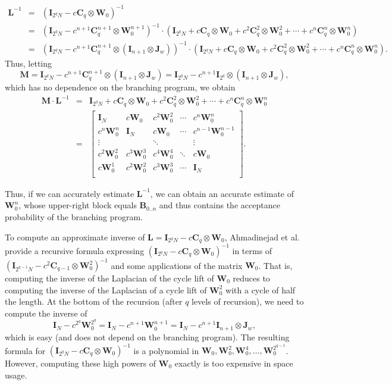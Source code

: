\documentclass[11pt]{article}
\numberwithin{equation}{section}
\theoremstyle{definition}
\theoremstyle{plain}
\newcommand{\mB}{\mathbf{B}}
\newcommand{\mC}{\mathbf{C}}
\newcommand{\mM}{\mathbf{M}}
\newcommand{\mW}{\mathbf{W}}
\newcommand{\mL}{\mathbf{L}}
\newcommand{\I}{\mathbf{I}}
\newcommand{\Jw}{\mathbf{J}_w}
\begin{document}
    \begin{eqnarray*}
    \mL^{-1} \!\!\! &=&\!\!\!\! \left(\I_{2^qN} - c \mC_q\otimes \mW_0\right)^{-1}\\
    &=& \!\!\! \left(\I_{2^qN} - c^{n+1} \mC_q^{n+1} \otimes \mW_0^{n+1}\right)^{-1}\cdot
    \left(\I_{2^qN} + c \mC_q\otimes \mW_0 +c^2 \mC^2_q\otimes \mW_0^2 + \cdots +
    c^n \mC^n_q\otimes \mW_0^n\right)\\
    &=& \!\!\! \left(\I_{2^qN} - c^{n+1} \mC_q^{n+1}\otimes(\I_{n+1} \otimes \Jw)\right)^{-1} \cdot 
        \left(\I_{2^qN} + c \mC_q\otimes \mW_0 +c^2 \mC^2_q\otimes \mW_0^2 + \cdots +
    c^n \mC^n_q\otimes \mW_0^n\right).  %
    \end{eqnarray*}
%
    Thus, letting $$\mM = \I_{2^qN} - c^{n+1} \mC_q^{n+1}\otimes(\I_{n+1} \otimes \Jw)= \I_{2^qN} - c^{n+1} \I_{2^q}\otimes(\I_{n+1} \otimes \Jw),$$
    which has no dependence on the branching program,
    we %
    obtain %
    \begin{eqnarray*}
    \mM\cdot \mL^{-1}
    &=& \I_{2^qN} + c \mC_q\otimes \mW_0 +c^2 \mC^2_q\otimes \mW_0^2 + \cdots + 
    c^n \mC^n_q\otimes \mW_0^n\\
    &=&
    \begin{bmatrix}
    \I_N & c\mW_0 & c^2\mW_0^2 & \cdots & c^n\mW_0^n \\
    c^n\mW_0^n & \I_N & c\mW_0 & \cdots & c^{n-1}\mW_0^{n-1} \\
    \vdots & & \ddots & & \vdots\\
    c^2\mW_0^2 & c^3\mW_0^3 & c^4\mW_0^4 & \ddots & c\mW_0\\
    c\mW_0^1 & c^2\mW_0^2 & c^3\mW_0^3 & \cdots &  \I_N \\
    \end{bmatrix}.
    \end{eqnarray*}

    Thus, if we can accurately estimate $\mL^{-1}$, we can
    obtain an accurate estimate of  $\mW_0^n$, whose upper-right block equals $\mB_{0..n}$ and thus contains the acceptance probability of the 
    branching program.
    
    To compute an approximate inverse of $\mL=\I_{2^qN} - c \mC_q \otimes \mW_0$, 
%
Ahmadinejad  %
et al. provide a recursive formula
    expressing $(\I_{2^qN} - c \mC_q \otimes \mW_0)^{-1}$ in terms of
    $(\I_{2^{q-1}N} - c^2 \mC_{q-1} \otimes \mW^2_0)^{-1}$ and some applications of the matrix $\mW_0$.
    That is, computing the inverse of the Laplacian of the cycle lift of $\mW_0$ reduces
    to computing the inverse of the Laplacian of a cycle lift of $\mW_0^2$ with a cycle of half the length.  At the bottom of the recursion (after $q$ levels of recursion), we need to compute the inverse of $$\I_N-c^{2^q}\mW_0^{2^q} = \I_N - c^{n+1}\mW_0^{n+1} = \I_N - c^{n+1} \I_{n+1}\otimes \Jw,$$
    which is easy (and does not depend on the branching program).
    The resulting formula for $(\I_{2^qN} - c \mC_q \otimes \mW_0)^{-1}$
    is a polynomial in $\mW_0,\mW_0^2,\mW_0^4,\ldots,\mW_0^{2^{q-1}}$.
    However, computing these high powers of $\mW_0$ exactly is too expensive in space usage.  
    
\end{document}
